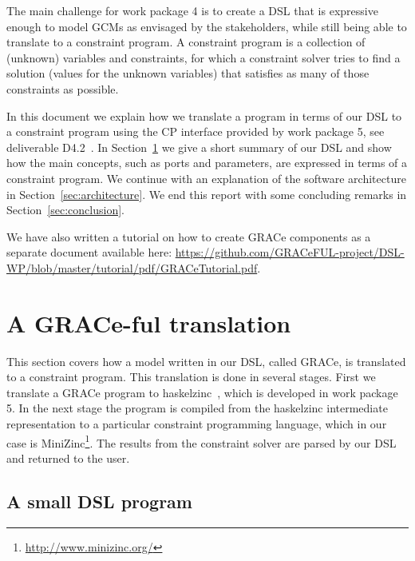 \documentclass{article}
\begin{document}
The main challenge for work package 4 is to create a \ac{DSL} that is expressive
enough to model \acp{GCM} as envisaged by the stakeholders, while still being
able to translate to a constraint program. A constraint program is a
collection of (unknown) variables and constraints, for which a constraint solver
tries to find a solution (values for the unknown variables) that satisfies as
many of those constraints as possible.

In this document we explain how we translate a program in terms of our \ac{DSL}
to a constraint program using the \ac{CP} interface provided by work package 5,
see deliverable D4.2~\cite{D4.2}. In Section~\ref{sec:translate} we give a short summary
of our \ac{DSL} and show how the main concepts, such as ports and parameters,
are expressed in terms of a constraint program. We continue with an explanation
of the software architecture in Section~\ref{sec:architecture}. We end this
report with some concluding remarks in Section~\ref{sec:conclusion}.

We have also written a tutorial on how to create GRACe components as a
separate document available here:
\url{https://github.com/GRACeFUL-project/DSL-WP/blob/master/tutorial/pdf/GRACeTutorial.pdf}.

\newpage

\section{A GRACe-ful translation}
\label{sec:translate}


This section covers how a model written in our DSL, called GRACe, is
translated to a constraint program.
%
This translation is done in several stages.
%
First we translate a GRACe program to haskelzinc~\cite{D5.1}, which is
developed in work package 5.
%
In the next stage the program is compiled from the haskelzinc
intermediate representation to a particular constraint programming
language, which in our case is
MiniZinc\footnote{\url{http://www.minizinc.org/}}.
%
The results from the constraint solver are parsed by our \ac{DSL} and
returned to the user.

\subsection{A small DSL program}
\end{document}
